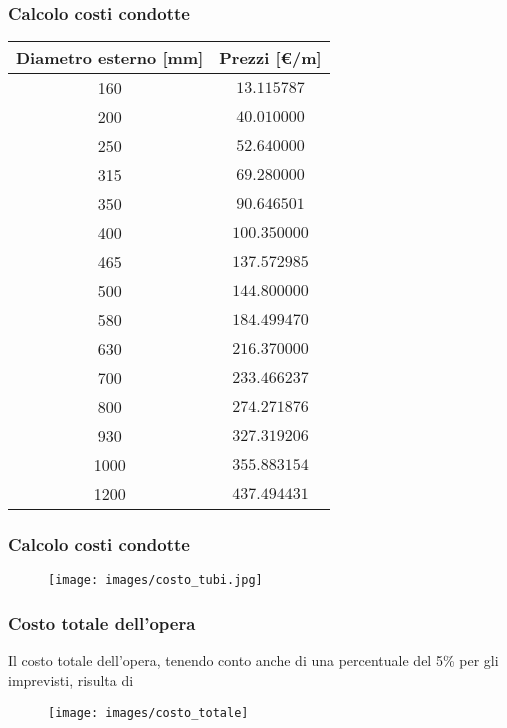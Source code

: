 \documentclass{beamer}
\newcommand{\nologo}{\setbeamertemplate{logo}{}}
\begin{document}
\begin{frame}
 \frametitle{Calcolo costi condotte}
 \footnotesize
 \begin{table}
  \begin{tabular}{cc}
  \toprule
  Diametro esterno [mm]& Prezzi [\euro/m] \\
  \midrule
  160                   &     $13.115787$ \\
  200                   &     $40.010000$ \\
  250                   &     $52.640000$ \\
  315                   &     $69.280000$ \\
  350                   &     $90.646501$ \\
  400                   &    $100.350000$ \\
  465                   &    $137.572985 $\\
  500                   &    $144.800000 $\\
  580                   &    $184.499470$ \\
  630                   &    $216.370000$ \\
  700                   &    $233.466237$ \\
  800                   &    $274.271876$ \\
  930                   &   $ 327.319206 $\\
  1000                  &   $ 355.883154$ \\
  1200                  &   $ 437.494431$ \\
  \bottomrule
  \end{tabular}
 \end{table}
\end{frame}

{\nologo
\begin{frame}
 \frametitle{Calcolo costi condotte}
 \begin{figure}
  \centering
  \texttt{[image: images/costo\_tubi.jpg]}
 \end{figure}
\end{frame}
}

\begin{frame}
 \frametitle{Costo totale dell'opera}
 Il costo totale dell'opera, tenendo conto anche di una percentuale del 5\% per gli imprevisti, risulta di
 \begin{figure}
  \centering
  \texttt{[image: images/costo\_totale]}
 \end{figure}
\end{frame}
\end{document}
